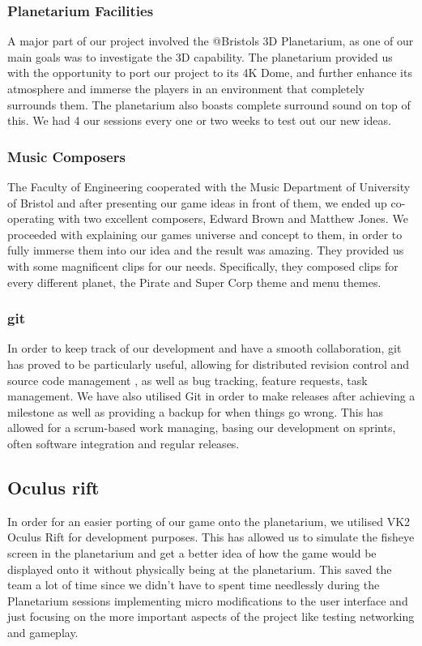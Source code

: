 \documentclass[11pt,a4paper]{article}
\begin{document}
 \subsubsection{  Planetarium Facilities}
 A major part of our project involved the @Bristols 3D Planetarium, as one of our main goals was to investigate the 3D capability. The planetarium provided us with the opportunity to port our project to its 4K Dome, and further enhance its atmosphere and immerse the players in an environment that completely surrounds them. The planetarium also boasts complete surround sound on top of this. We had 4 our sessions every one or two weeks to test out our new ideas.

 \subsubsection{ Music Composers}
 The Faculty of Engineering cooperated with the Music Department of University of Bristol and after presenting our game ideas in front of them, we ended up co-operating with two excellent composers, Edward Brown and Matthew Jones. We proceeded with explaining our games universe and concept to them, in order to fully immerse them into our idea and the result was amazing. They provided us with some magnificent clips for our needs. Specifically, they composed clips for every different planet, the Pirate and Super Corp theme and  menu themes.


 \subsubsection{git}
 In order to keep track of our development and have a smooth collaboration, git has proved to be particularly useful, allowing for distributed revision control and source code management , as well as bug tracking, feature requests, task management. We have also utilised Git in order to make releases after achieving a milestone as well as providing a backup for when things go wrong. This has allowed for a scrum-based work managing, basing our development on sprints, often software integration and regular releases.


 \subsection{Oculus rift} 
 In order for an easier porting of our game onto the planetarium, we utilised VK2 Oculus Rift for development purposes. This has allowed us to simulate the fisheye screen in the planetarium and get a better idea of how the game would be displayed onto it without physically being at the planetarium. This saved the team a lot of time since we didn’t have to spent time needlessly during the Planetarium sessions implementing micro modifications to the user interface and just focusing on the more important aspects of the project like testing networking and gameplay.
\end{document}
